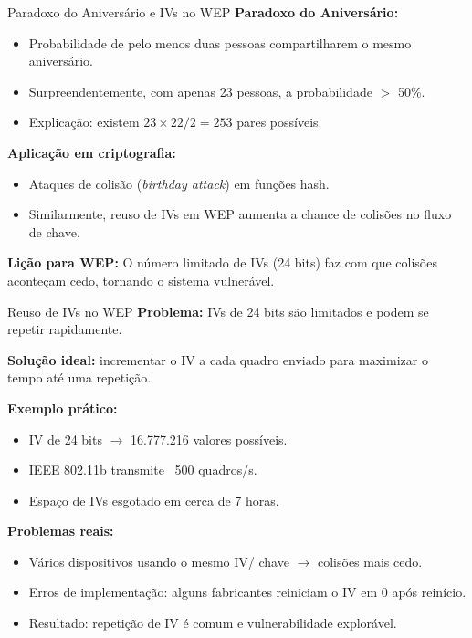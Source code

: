 \begin{frame}{Paradoxo do Aniversário e IVs no WEP}
    \textbf{Paradoxo do Aniversário:}
    \begin{itemize}
        \item Probabilidade de pelo menos duas pessoas compartilharem o mesmo aniversário.
        \item Surpreendentemente, com apenas 23 pessoas, a probabilidade $>$ 50\%.
        \item Explicação: existem $23 \times 22 / 2 = 253$ pares possíveis.
    \end{itemize}

    \medskip
    \textbf{Aplicação em criptografia:}
    \begin{itemize}
        \item Ataques de colisão (\emph{birthday attack}) em funções hash.
        \item Similarmente, reuso de IVs em WEP aumenta a chance de colisões no fluxo de chave.
    \end{itemize}

    \medskip
    \textbf{Lição para WEP:} O número limitado de IVs (24 bits) faz com que colisões aconteçam cedo, tornando o sistema vulnerável.
\end{frame}

\begin{frame}{Reuso de IVs no WEP}
    \textbf{Problema:} IVs de 24 bits são limitados e podem se repetir rapidamente.

    \medskip
    \textbf{Solução ideal:} incrementar o IV a cada quadro enviado para maximizar o tempo até uma repetição.

    \medskip
    \textbf{Exemplo prático:}
    \begin{itemize}
        \item IV de 24 bits $\rightarrow$ 16.777.216 valores possíveis.
        \item IEEE 802.11b transmite ~500 quadros/s.
        \item Espaço de IVs esgotado em cerca de 7 horas.
    \end{itemize}

    \medskip
    \textbf{Problemas reais:}
    \begin{itemize}
        \item Vários dispositivos usando o mesmo IV/ chave $\rightarrow$ colisões mais cedo.
        \item Erros de implementação: alguns fabricantes reiniciam o IV em 0 após reinício.
        \item Resultado: repetição de IV é comum e vulnerabilidade explorável.
    \end{itemize}
\end{frame}

